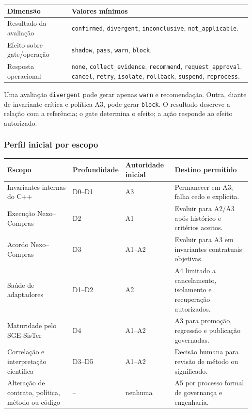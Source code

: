\documentclass[11pt,a4paper,oneside]{article}
\begin{document}
\begin{tabularx}{\textwidth}{P{4.0cm}Y}
\toprule
\textbf{Dimensão} & \textbf{Valores mínimos} \\
\midrule
Resultado da avaliação & \texttt{confirmed}, \texttt{divergent}, \texttt{inconclusive}, \texttt{not\_applicable}. \\
Efeito sobre gate/operação & \texttt{shadow}, \texttt{pass}, \texttt{warn}, \texttt{block}. \\
Resposta operacional & \texttt{none}, \texttt{collect\_evidence}, \texttt{recommend}, \texttt{request\_approval}, \texttt{cancel}, \texttt{retry}, \texttt{isolate}, \texttt{rollback}, \texttt{suspend}, \texttt{reprocess}. \\
\bottomrule
\end{tabularx}

Uma avaliação \texttt{divergent} pode gerar apenas \texttt{warn} e recomendação. Outra, diante de invariante crítica e política A3, pode gerar \texttt{block}. O resultado descreve a relação com a referência; o gate determina o efeito; a ação responde ao efeito autorizado.

\subsubsection{Perfil inicial por escopo}
\begin{longtable}{P{5.0cm}P{2.3cm}P{3.0cm}P{4.4cm}}
\toprule
\textbf{Escopo} & \textbf{Profundidade} & \textbf{Autoridade inicial} & \textbf{Destino permitido} \\
\midrule
\endhead
Invariantes internas do C++ & D0--D1 & A3 & Permanecer em A3; falha cedo e explícita. \\
Execução Nexo--Compras & D2 & A1 & Evoluir para A2/A3 após histórico e critérios aceitos. \\
Acordo Nexo--Compras & D3 & A1--A2 & Evoluir para A3 em invariantes contratuais objetivas. \\
Saúde de adaptadores & D1--D2 & A2 & A4 limitado a cancelamento, isolamento e recuperação autorizados. \\
Maturidade pelo SGE-SisTer & D4 & A1--A2 & A3 para promoção, regressão e publicação governadas. \\
Correlação e interpretação científica & D3--D5 & A1--A2 & Decisão humana para revisão de método ou significado. \\
Alteração de contrato, política, método ou código & -- & nenhuma & A5 por processo formal de governança e engenharia. \\
\bottomrule
\end{longtable}
\end{document}

